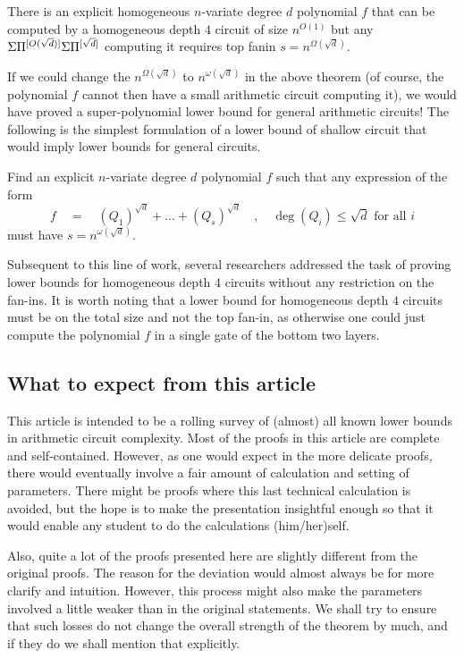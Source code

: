 \begin{theorem}
There is an explicit homogeneous $n$-variate degree $d$ polynomial $f$ that can be computed by a homogeneous depth $4$ circuit of size $n^{O(1)}$ but any $\Sigma\Pi^{[O(\sqrt{d})]}\Sigma\Pi^{[\sqrt{d}]}$ computing it requires top fanin $s = n^{\Omega(\sqrt{d})}$.
\end{theorem}

If we could change the $n^{\Omega(\sqrt{d})}$ to $n^{\omega(\sqrt{d})}$ in the above theorem (of course, the polynomial $f$ cannot then have a small arithmetic circuit computing it), we would have proved a super-polynomial lower bound for general arithmetic circuits! 
The following is the simplest formulation of a lower bound of shallow circuit that would imply lower bounds for general circuits. \\

\begin{openproblem}\label{openprob:main} Find an explicit $n$-variate degree $d$ polynomial $f$ such that any expression of the form
\[
f \quad=\quad (Q_1)^{\sqrt{d}} + \dots + (Q_{s})^{\sqrt{d}}\quad,\quad \deg(Q_i) \leq \sqrt{d} \text{ for all $i$}
\]
must have $s = n^{\omega(\sqrt{d})}$. 
\end{openproblem}
\bigskip 

Subsequent to this line of work, several researchers addressed the task of proving lower bounds for homogeneous depth $4$ circuits without any restriction on the fan-ins. 
It is worth noting that a lower bound for homogeneous depth $4$ circuits must be on the total size and not the top fan-in, as otherwise one could just compute the polynomial $f$ in a single gate of the bottom two layers. 

\subsection*{What to expect from this article}

This article is intended to be a rolling survey of (almost) all known lower bounds in arithmetic circuit complexity. 
Most of the proofs in this article are complete and self-contained. 
However, as one would expect in the more delicate proofs, there would eventually involve a fair amount of calculation and setting of parameters. 
There might be proofs where this last technical calculation is avoided, but the hope is to make the presentation insightful enough so that it would enable any student to do the calculations (him/her)self.

Also, quite a lot of the proofs presented here are slightly different from the original proofs. 
The reason for the deviation would almost always be for more clarify and intuition. 
However, this process might also make the parameters involved a little weaker than in the original statements. 
We shall try to ensure that such losses do not change the overall strength of the theorem by much, and if they do we shall mention that explicitly. 

